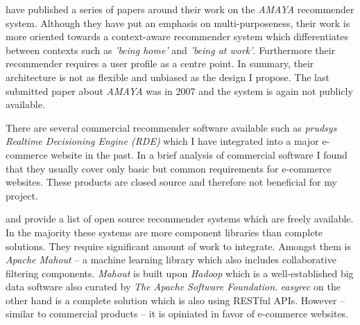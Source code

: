 \citet{rack07} have published a series of papers around their work on the \emph{AMAYA} recommender system. Although they have put an emphasis on multi-purposeness, their work is more oriented towards a context-aware recommender system which differentiates between contexts such as \emph{'being home'} and \emph{'being at work'}. Furthermore their recommender requires a user profile as a centre point. In summary, their architecture is not as flexible and unbiased as the design I propose. The last submitted paper about \emph{AMAYA} was in 2007 and the system is again not publicly available.

There are several commercial recommender software available such as \emph{prudsys Realtime Decisioning Engine (RDE)} which I have integrated into a major e-commerce website in the past. In a brief analysis of commercial software I found that they usually cover only basic but common requirements for e-commerce websites. These products are closed source and therefore not beneficial for my project. 

\citet{hahsler11} and \citet{rack07} provide a list of open source recommender systems which are freely available. In the majority these systems are more component libraries than complete solutions. They require significant amount of work to integrate. Amongst them is \emph{Apache Mahout} -- a machine learning library which also includes collaborative filtering components. \emph{Mahout} is built upon \emph{Hadoop} which is a well-established big data software also curated by \emph{The Apache Software Foundation}. \emph{easyrec} on the other hand is a complete solution which is also using RESTful APIs. However -- similar to commercial products -- it is opiniated in favor of e-commerce websites.